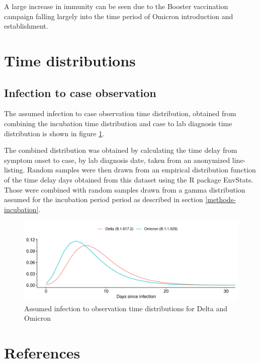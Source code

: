 \documentclass[
]{article}
\begin{document}
A large increase in immunity can be seen due to the Booster vaccination campaign
falling largely into the time period of Omicron introduction and establishment.

\hypertarget{time-distributions}{%
\section{Time distributions}\label{time-distributions}}

\hypertarget{infection-to-case-observation}{%
\subsection{Infection to case observation}\label{infection-to-case-observation}}

The assumed infection to case observation time distribution, obtained from combining the
incubation time distribution and case to lab diagnosis time distribution is shown in
figure \ref{fig:i2o-delta-omicron}.

The combined distribution was obtained by calculating the time delay from symptom onset
to case, by lab diagnosis date, taken from an anonymized line-listing. Random samples were
then drawn from an empirical distribution function of the time delay days obtained
from this dataset using the R package EnvStats. Those were combined with random
samples drawn from a gamma distribution assumed for the incubation period period
as described in section \ref{methods-incubation}.

\begin{figure}

{\centering \includegraphics[width=0.75\linewidth]{omicron_austria_files/figure-latex/i2o-delta-omicron-1} 

}

\caption{Assumed infection to observation time distributions for Delta and Omicron}\label{fig:i2o-delta-omicron}
\end{figure}

\hypertarget{references}{%
\section*{References}\label{references}}
\end{document}
